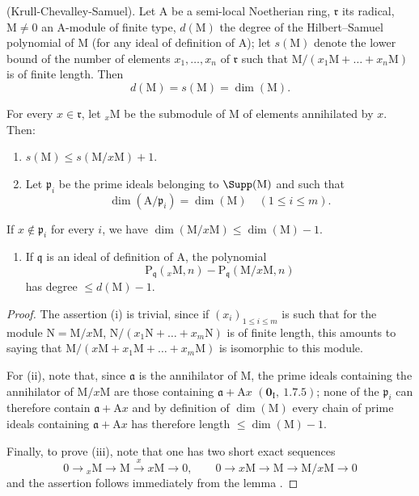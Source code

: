\begin{theorem}[16.2.3]
\label{0.16.2.3}
\textup{(Krull-Chevalley-Samuel).}
Let $\mathrm{A}$ be a semi-local Noetherian ring, $\mathfrak{r}$ its radical, $\mathrm{M}\neq 0$ an $\mathrm{A}$-module of finite type, $d(\mathrm{M})$ the degree of the Hilbert--Samuel polynomial of $\mathrm{M}$ (for any ideal of definition of $\mathrm{A}$); let $s(\mathrm{M})$ denote the lower bound of the number of elements $x_1,\ldots,x_n$ of $\mathfrak{r}$ such that $\mathrm{M}/(x_1\mathrm{M}+\ldots+x_n\mathrm{M})$ is of finite length.
Then
\[
  d(\mathrm{M})=s(\mathrm{M})=\dim(\mathrm{M}).
\]
\end{theorem}

\begin{lemma}[16.2.3.1]
\label{0.16.2.3.1}
For every $x\in\mathfrak{r}$, let ${}_x\mathrm{M}$ be the submodule of $\mathrm{M}$ of elements annihilated by $x$.
Then:
\begin{enumerate}
  \item[\rm{(i)}] $s(\mathrm{M})\leq s(\mathrm{M}/x\mathrm{M})+1$.
  \item[\rm{(ii)}] Let $\mathfrak{p}_i$ be the prime ideals belonging to $\Supp(\mathrm{M})$ and such that
  \[
    \dim(\mathrm{A}/\mathfrak{p}_i)=\dim(\mathrm{M})\quad(1\leq i\leq m).
  \]
\end{enumerate}
If $x\notin\mathfrak{p}_i$ for every $i$, we have $\dim(\mathrm{M}/x\mathrm{M})\leq\dim(\mathrm{M})-1$.
\begin{enumerate}
  \item[\rm{(iii)}] If $\mathfrak{q}$ is an ideal of definition of $\mathrm{A}$, the polynomial
  \[
    \mathrm{P}_\mathfrak{q}({}_x\mathrm{M},n)-\mathrm{P}_\mathfrak{q}(\mathrm{M}/x\mathrm{M},n)
  \]
  has degree $\leq d(\mathrm{M})-1$.
\end{enumerate}
\end{lemma}

\begin{proof}
The assertion (i) is trivial, since if $(x_i)_{1\leq i\leq m}$ is such that for the module $\mathrm{N}=\mathrm{M}/x\mathrm{M}$, $\mathrm{N}/(x_1\mathrm{N}+\ldots+x_m\mathrm{N})$ is of finite length, this amounts to saying that $\mathrm{M}/(x\mathrm{M}+x_1\mathrm{M}+\ldots+x_m\mathrm{M})$ is isomorphic to this module.

For (ii), note that, since $\mathfrak{a}$ is the annihilator of $\mathrm{M}$, the prime ideals containing the annihilator of $\mathrm{M}/x\mathrm{M}$ are those containing $\mathfrak{a}+\mathrm{A}x$ $(\mathbf{0}_\mathrm{I},~1.7.5)$; none of the $\mathfrak{p}_i$ can therefore contain $\mathfrak{a}+\mathrm{A}x$ and by definition of $\dim(\mathrm{M})$  every chain of prime ideals containing $\mathfrak{a}+\mathrm{A}x$ has therefore length $\leq\dim(\mathrm{M})-1$.

Finally, to prove (iii), note that one has two short exact sequences
\[
  0\to{}_x\mathrm{M}\to\mathrm{M}\xrightarrow{x}x\mathrm{M}\to 0,\qquad 0\to x\mathrm{M}\to\mathrm{M}\to\mathrm{M}/x\mathrm{M}\to 0
\]
and the assertion follows immediately from the lemma .
\end{proof}

